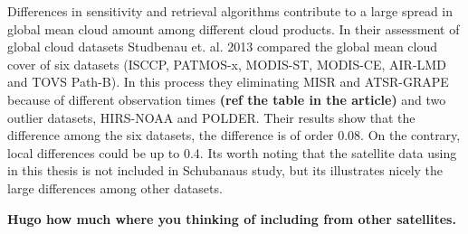 Differences in sensitivity and retrieval algorithms contribute to a large spread in global mean cloud amount among different cloud products. In their assessment of global cloud datasets Studbenau et. al. 2013 compared the global mean cloud cover of six datasets (ISCCP, PATMOS-x, MODIS-ST, MODIS-CE, AIR-LMD and TOVS Path-B). In this process they eliminating MISR and ATSR-GRAPE because of different observation times \textbf{(ref the table in the article)} and two outlier datasets, HIRS-NOAA and POLDER. Their results show that the difference among the six datasets, the difference is of order 0.08. On the contrary, local differences could be up to 0.4. Its worth noting that the satellite data using in this thesis is not included in Schubanaus study, but its illustrates nicely the large differences among other datasets. 


\textbf{Hugo how much where you thinking of including from other satellites.}


